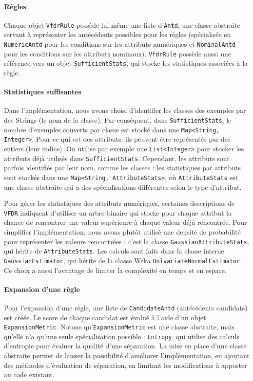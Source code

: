         \paragraph{Règles}Chaque objet \texttt{VfdrRule} possède lui-même une liste d’\texttt{Antd}, une classe abstraite servant à représenter les antécédents possibles pour les règles (spécialisée en \texttt{NumericAntd} pour les conditions sur les attributs numériques et \texttt{NominalAntd} pour les conditions sur les attributs nominaux). \texttt{VfdrRule} possède aussi une référence vers un objet \texttt{SufficientStats}, qui stocke les statistiques associées à la règle. 


        \paragraph{Statistiques suffisantes} 
            Dans l’implémentation, nous avons choisi d’identifier les classes des exemples par des Strings (le nom de la classe). Par conséquent, dans \texttt{SufficientStats}, le nombre d’exemples couverts par classe est stocké dans une \texttt{Map<String, Integer>}. Pour ce qui est des attributs, ils peuvent être représentés par des entiers (leur indice). On utilise par exemple une \texttt{List<Integer>} pour stocker les attributs déjà utilisés dans \texttt{SufficientStats}. Cependant, les attributs sont parfois identifiés par leur nom, comme les classes : les statistiques par attributs sont stockés dans une \texttt{Map<String, \texttt{AttributeStats}>}, où \texttt{AttributeStats} est une classe abstraite qui a des spécialisations différentes selon le type d’attribut.
            
            Pour gérer les statistiques des attributs numériques, certaines descriptions de \texttt{VFDR} indiquent d’utiliser un arbre binaire qui stocke pour chaque attribut la chance de rencontrer une valeur supérieure à chaque valeur déjà rencontrée. Pour simplifier l’implémentation, nous avons plutôt utilisé une densité de probabilité pour représenter les valeurs rencontrées : c’est la classe \texttt{GaussianAttributeStats}, qui hérite de \texttt{AttributeStats}. Les calculs sont faits dans la classe interne \texttt{GaussianEstimator}, qui hérite de la classe Weka \texttt{UnivariateNormalEstimator}. Ce choix a aussi l’avantage de limiter la complexité en temps et en espace.
        
        \paragraph{Expansion d'une règle} Pour l’expansion d’une règle, une liste de \texttt{CandidateAntd} (antécédents candidats) est créée. Le score de chaque candidat est évalué à l’aide d’un objet \texttt{ExpansionMetric}. Notons qu’\texttt{ExpansionMetric} est une classe abstraite, mais qu’elle n’a qu’une seule spécialisation possible : \texttt{Entropy}, qui utilise des calculs d’entropie pour évaluer la qualité d’une séparation. La mise en place d’une classe abstraite permet de laisser la possibilité d’améliorer l’implémentation, en ajoutant des méthodes d’évaluation de séparation, en limitant les modifications à apporter au code existant.
        
